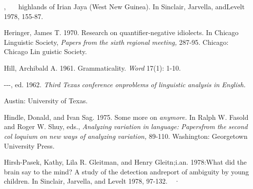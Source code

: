 \begin{styleStandard}
, \ \ \ highlands of Irian Jaya (West New Guinea). In Sinclair, Jarvella, andLevelt 1978, 155-87.
\end{styleStandard}


\begin{styleStandard}
Heringer, James T. 1970. Research on quantifier-negative idiolects. In Chicago Linguistic Society, \textit{Papers}\textit{ }\textit{from}\textit{ }\textit{the}\textit{ }\textit{sixth}\textit{ }\textit{regional}\textit{ }\textit{meeting,}\textit{ }287-95. Chicago: Chicago Lin\- guistic Society.
\end{styleStandard}


\begin{styleStandard}
Hill, Archibald A. 1961. Grammaticality. \textit{Word}\textit{ }17(1): 1-10.
\end{styleStandard}


\begin{styleStandard}
{}-{}-{}-, ed. 1962. \textit{Third}\textit{ }\textit{Texas}\textit{ }\textit{conference}\textit{ }\textit{o}\textit{n}\textit{problems}\textit{ }\textit{of}\textit{ }\textit{linguistic}\textit{ }\textit{analysis}\textit{ }\textit{in}\textit{ }\textit{English.}
\end{styleStandard}


\begin{styleStandard}
Austin: University of Texas.
\end{styleStandard}


\begin{styleStandard}
Hindle, Donald, and Ivan Sag. 1975. Some more on \textit{anymore.}\textit{ }In Ralph W. Fasold and Roger W. Shuy, eds., \textit{Analyzing}\textit{ }\textit{variation}\textit{ }\textit{in}\textit{ }\textit{language:}\textit{ }\textit{Papersfrom}\textit{ }\textit{the}\textit{ }\textit{second}\textit{ }\textit{col}\textit{ }\textit{loquium}\textit{ }\textit{on}\textit{ }\textit{new}\textit{ }\textit{ways of}\textit{ }\textit{analyzing}\textit{ }\textit{variation,}\textit{ }89-110. Washington: Georgetown University Press.
\end{styleStandard}


\begin{styleStandard}
Hirsh-Pasek, Kathy, Lila R. Gleitman, and Henry Gleitn;i.an. 1978:What did the brain say to the mind? A study of the detection andreport of ambiguity by young children. In Sinclair, Jarvella, and Levelt 1978, 97-132.\ \ ·
\end{styleStandard}



